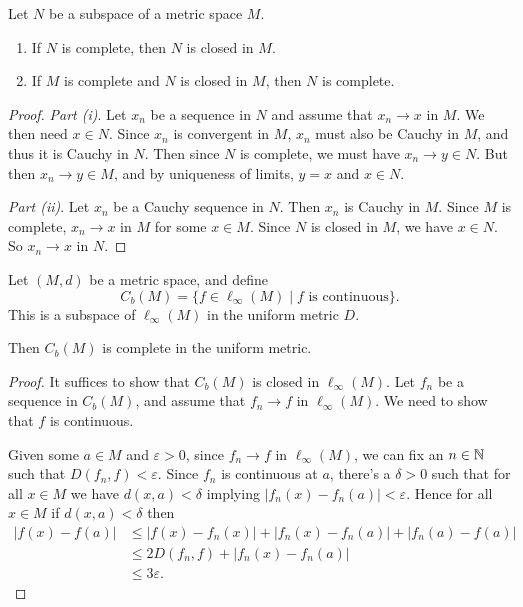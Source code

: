 \documentclass[a4paper]{scrartcl}
\begin{document}
\begin{proposition}
    Let $N$ be a subspace of a metric space $M$. 
    \begin{enumerate}[label=(\roman*)]
        \item If $N$ is complete, then $N$ is closed in $M$.
        \item If $M$ is complete and $N$ is closed in $M$, then $N$ is complete.
    \end{enumerate}
\end{proposition}
\begin{proof}
    \emph{Part (i)}. Let $x_n$ be a sequence in $N$ and assume that $x_n \rightarrow x$ in $M$. We then need $x \in N$. Since $x_n$ is convergent in $M$, $x_n$ must also be Cauchy in $M$, and thus it is Cauchy in $N$. Then since $N$ is complete, we must have $x_n \rightarrow y \in N$. But then $x_n \rightarrow y \in M$, and by uniqueness of limits, $y = x$ and $x \in N$.

    \emph{Part (ii)}. Let $x_n$ be a Cauchy sequence in $N$. Then $x_n$ is Cauchy in $M$. Since $M$ is complete, $x_n \rightarrow x$ in $M$ for some $x \in M$. Since $N$ is closed in $M$, we have $x \in N$. So $x_n \rightarrow x$ in $N$.
\end{proof}

\begin{theorem}
    Let $(M, d)$ be a metric space, and define
    $$
    C_b(M) = \{f \in \ell_{\infty}(M) \mid f \text{ is continuous} \}.
    $$
    This is a subspace of $\ell_{\infty}(M)$ in the uniform metric $D$.

    Then $C_b(M)$ is complete in the uniform metric.
\end{theorem}
\begin{proof}
It suffices to show that $C_b(M)$ is closed in $\ell_{\infty}(M)$. Let $f_n$ be a sequence in $C_b(M)$, and assume that $f_n \rightarrow f$ in $\ell_{\infty}(M)$. We need to show that $f$ is continuous.

Given some $a \in M$ and $\varepsilon > 0$, since $f_n \rightarrow f$ in $\ell_{\infty}(M)$, we can fix an $n \in \mathbb{N}$ such that $D(f_n, f) < \varepsilon$.
Since $f_n$ is continuous at $a$, there's a $\delta > 0$ such that for all $x \in M$ we have $d(x, a) < \delta$ implying $|f_n(x) - f_n(a)| < \varepsilon$. Hence for all $x \in M$ if $d(x,a) < \delta$ then
\begin{align*}
    |f(x) - f(a)| &\leq |f(x) - f_n(x)| + |f_n(x) - f_n(a)| + |f_n(a) - f(a)|  \\
    &\leq 2D(f_n, f) + |f_n(x) - f_n(a)|  \\
    & \leq 3\varepsilon.
\end{align*}
\end{proof}
\end{document}
